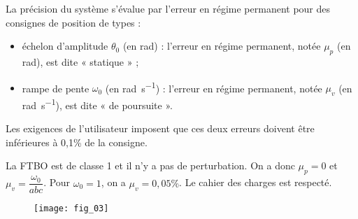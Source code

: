 \ifprof
\else

\ifprof
\else
{}
\fi

 La précision du système s’évalue par l’erreur en régime permanent pour des consignes de position de types :
 \begin{itemize}
 \item échelon d’amplitude $\theta_0$ (en \si{rad}) : l’erreur en régime permanent, notée $\mu_p$ (en rad), est dite « statique » ;
\item rampe de pente $\omega_0$ (en \si{rad.s^{-1}}) : l’erreur en régime permanent, notée $\mu_v$ (en \si{rad.s^{-1}}), est dite « de poursuite ».
\end{itemize}
Les exigences de l’utilisateur imposent que ces deux erreurs doivent être inférieures à 0,1\% de la consigne.
\fi

\ifprof
\begin{corrige}
La FTBO est de classe 1 et il n'y a pas de perturbation. On a donc $\mu_p = 0 $ et $\mu_v = \dfrac{\omega_0}{abc}$. Pour $\omega_0 =1$, on a $\mu_v =0,05\%$.
Le cahier des charges est respecté.
\end{corrige}
\else
\fi

 \begin{figure} [!h]
\centering
\texttt{[image: fig\_03]}
\end{figure}

